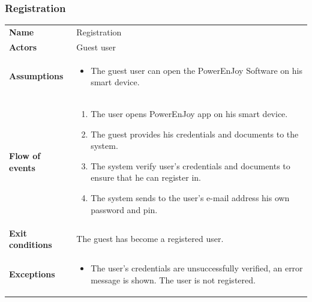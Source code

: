 \documentclass[english]{article}
\begin{document}
		\subsubsection{Registration}
		\begin{center}
		\begin{tabular}{l||p{10cm}}
		\textbf{Name} 
			& Registration\\ [8px]
		\textbf{Actors} 
			& Guest user\\ [8px]
		\textbf{Assumptions} 
			& \begin{itemize}
				\item The guest user can open the PowerEnJoy Software on his smart device.
			\end{itemize}\\
		\textbf{Flow of events}
			& \begin{enumerate}
	 			\item The user opens PowerEnJoy app on his  smart device.
				\item The guest provides his credentials and documents to the system.
				\item The system verify user's credentials and documents to ensure that he can register in.
				\item The system sends to the user's e-mail address his own password and pin.
			\end{enumerate}\\ 
		\textbf{Exit conditions}
			& The guest has become a registered user.\\ [8px]
		\textbf{Exceptions}
			& \begin{itemize}
				\item The user's credentials are unsuccessfully verified, an error message is shown. The user is not registered.
			\end{itemize}
		\end{tabular}
		\end{center}
	
		\noindent
\end{document}
